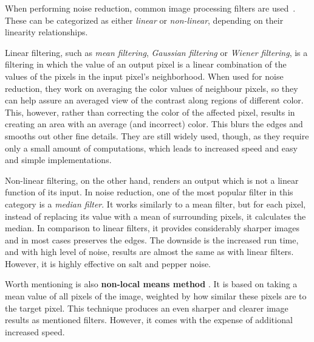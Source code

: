 When performing noise reduction, common image processing filters are used~\citep{denoisingTechniques}. These can be categorized as either \emph{linear} or \emph{non-linear}, depending on their linearity relationships.

Linear filtering, such as \emph{mean filtering}, \emph{Gaussian filtering} or \emph{Wiener filtering}, is a filtering in which the value of an output pixel is a linear combination of the values of the pixels in the input pixel's neighborhood. When used for noise reduction, they work on averaging the color values of neighbour pixels, so they can help assure an averaged view of the contrast along regions of different color. This, however, rather than correcting the color of the affected pixel, results in creating an area with an average (and incorrect) color. This blurs the edges and smooths out other fine details. They are still widely used, though, as they require only a small amount of computations, which leads to increased speed and easy and simple implementations.

Non-linear filtering, on the other hand, renders an output which is not a linear function of its input. In noise reduction, one of the most popular filter in this category is a \emph{median filter}. It works similarly to a mean filter, but for each pixel, instead of replacing its value with a mean of surrounding pixels, it calculates the median. In comparison to linear filters, it provides considerably sharper images and in most cases preserves the edges. The downside is the increased run time, and with high level of noise, results are almost the same as with linear filters. However, it is highly effective on salt and pepper noise.

Worth mentioning is also \textbf{non-local means method} \citep{nonLocalMeans}. It is based on taking a mean value of all pixels of the image, weighted by how similar these pixels are to the target pixel. This technique produces an even sharper and clearer image results as mentioned filters. However, it comes with the expense of additional increased speed.


